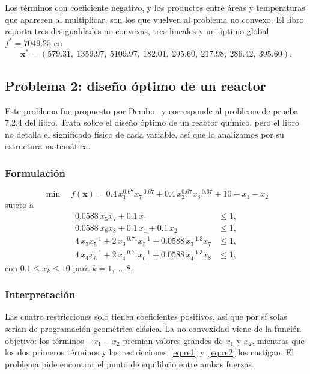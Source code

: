 Los términos con coeficiente negativo, y los productos entre áreas y temperaturas que aparecen al multiplicar, son los que vuelven al problema no convexo. El libro reporta tres desigualdades no convexas, tres lineales y un óptimo global $f^* = 7049.25$ en
\[
\mathbf{x}^* = (579.31,\ 1359.97,\ 5109.97,\ 182.01,\ 295.60,\ 217.98,\ 286.42,\ 395.60).
\]

\subsection{Problema 2: diseño óptimo de un reactor}
\label{sec:problema_reactor}

Este problema fue propuesto por Dembo~\cite{dembo1976set} y corresponde al problema de prueba 7.2.4 del libro. Trata sobre el diseño óptimo de un reactor químico, pero el libro no detalla el significado físico de cada variable, así que lo analizamos por su estructura matemática.

\subsubsection{Formulación}

\begin{equation}
\min \quad f(\mathbf{x}) = 0.4\,x_1^{0.67} x_7^{-0.67} + 0.4\,x_2^{0.67} x_8^{-0.67} + 10 - x_1 - x_2
\end{equation}
sujeto a
\begin{align}
0.0588\,x_5 x_7 + 0.1\,x_1 &\le 1, \label{eq:re1}\\
0.0588\,x_6 x_8 + 0.1\,x_1 + 0.1\,x_2 &\le 1, \label{eq:re2}\\
4\,x_3 x_5^{-1} + 2\,x_3^{-0.71} x_5^{-1} + 0.0588\,x_3^{-1.3} x_7 &\le 1, \label{eq:re3}\\
4\,x_4 x_6^{-1} + 2\,x_4^{-0.71} x_6^{-1} + 0.0588\,x_4^{-1.3} x_8 &\le 1, \label{eq:re4}
\end{align}
con $0.1 \le x_k \le 10$ para $k = 1, \dots, 8$.

\subsubsection{Interpretación}

Las cuatro restricciones solo tienen coeficientes positivos, así que por sí solas serían de programación geométrica clásica. La no convexidad viene de la función objetivo: los términos $-x_1 - x_2$ premian valores grandes de $x_1$ y $x_2$, mientras que los dos primeros términos y las restricciones~\eqref{eq:re1} y~\eqref{eq:re2} los castigan. El problema pide encontrar el punto de equilibrio entre ambas fuerzas.

